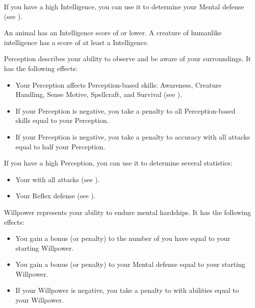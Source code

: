                 If you have a high Intelligence, you can use it to determine your Mental defense (see ).

                \par An animal has an Intelligence score of  or lower.
                A creature of humanlike intelligence has a score of at least a  Intelligence.

            \label{Perception}
                Perception describes your ability to observe and be aware of your surroundings.
                It has the following effects:
                \begin{itemize}
                    \item Your Perception affects Perception-based skills: Awareness, Creature Handling, Sense Motive, Spellcraft, and Survival (see ).
                    \item If your Perception is negative, you take a penalty to all Perception-based skills equal to your Perception.
                    \item If your Perception is negative, you take a penalty to accuracy with all attacks equal to half your Perception.
                \end{itemize}

                If you have a high Perception, you can use it to determine several statistics:
                \begin{itemize}
                    \item Your  with all attacks (see ).
                    \item Your Reflex defense (see ).
                \end{itemize}

            \label{Willpower}
                Willpower represents your ability to endure mental hardships.
                It has the following effects:
                \begin{itemize}
                    \item You gain a bonus (or penalty) to the number of  you have equal to your starting Willpower.
                    \item You gain a bonus (or penalty) to your Mental defense equal to your starting Willpower.
                    \item If your Willpower is negative, you take a penalty to  with  abilities equal to your Willpower.
                \end{itemize}

